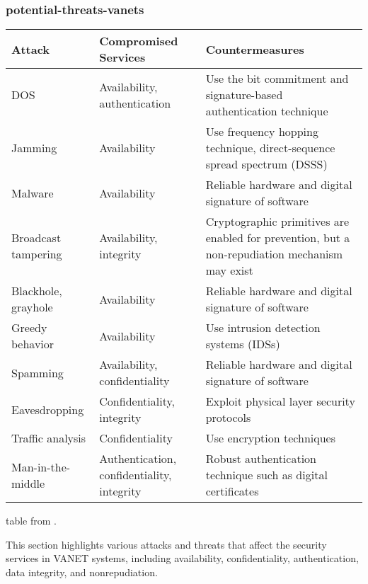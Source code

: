 \subsubsection{potential-threats-vanets}\label{subsubsec:potentials-threats-vanets}

\begin{table}[h]
    \centering
    \begin{tabular}{|l|l|l|}
        \hline
        \textbf{Attack} & \textbf{Compromised Services} & \textbf{Countermeasures} \\ \hline
        DOS & Availability, authentication & Use the bit commitment and signature-based authentication technique \\ \hline
        Jamming & Availability & Use frequency hopping technique, direct-sequence spread spectrum (DSSS) \\ \hline
        Malware & Availability & Reliable hardware and digital signature of software \\ \hline
        Broadcast tampering & Availability, integrity & Cryptographic primitives are enabled for prevention, but a non-repudiation mechanism may exist \\ \hline
        Blackhole, grayhole & Availability & Reliable hardware and digital signature of software \\ \hline
        Greedy behavior & Availability & Use intrusion detection systems (IDSs) \\ \hline
        Spamming & Availability, confidentiality & Reliable hardware and digital signature of software \\ \hline
        Eavesdropping & Confidentiality, integrity & Exploit physical layer security protocols \\ \hline
        Traffic analysis & Confidentiality & Use encryption techniques \\ \hline
        Man-in-the-middle & Authentication, confidentiality, integrity & Robust authentication technique such as digital certificates \\ \hline
    \end{tabular}
    \label{tab:Summary of Attacks and Countermeasures. }
\end{table}

table from \cite{sheikh2019comprehensive} .


This section highlights various attacks and threats that affect the security services in VANET systems, including availability, confidentiality, authentication, data integrity, and nonrepudiation.

